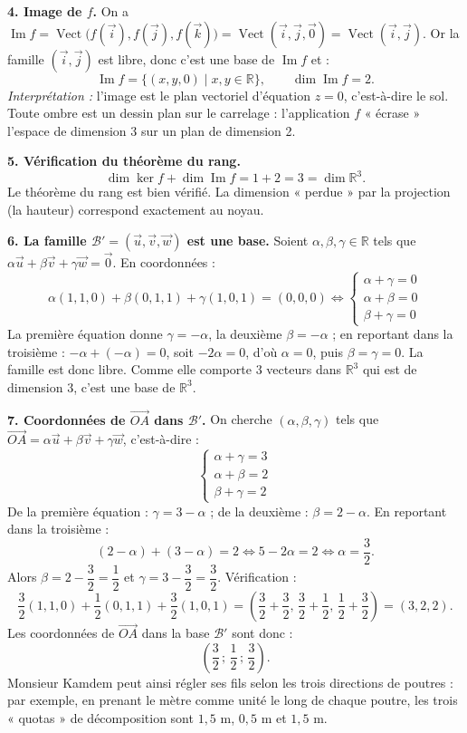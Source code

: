 \documentclass[11pt]{article}
\newcommand{\cle}[1]{{\popxbold\color{popdark}#1}}
\begin{document}
\begin{exoresolu}
\textbf{4. Image de $f$.} On a $\operatorname{Im} f = \operatorname{Vect}\big(f(\vec{i}), f(\vec{j}), f(\vec{k})\big) = \operatorname{Vect}(\vec{i}, \vec{j}, \vec{0}) = \operatorname{Vect}(\vec{i}, \vec{j})$. Or la famille $(\vec{i}, \vec{j})$ est libre, donc c'est une base de $\operatorname{Im} f$ et :
\[
\operatorname{Im} f = \{(x,y,0) \mid x, y \in \mathbb{R}\}, \qquad \dim \operatorname{Im} f = 2.
\]
\emph{Interprétation :} l'image est le plan vectoriel d'équation $z = 0$, c'est-à-dire le sol. Toute ombre est un dessin plan sur le carrelage : l'application $f$ « écrase » l'espace de dimension 3 sur un plan de dimension 2.

\textbf{5. Vérification du théorème du rang.}
\[
\dim \ker f + \dim \operatorname{Im} f = 1 + 2 = 3 = \dim \mathbb{R}^3.
\]
Le théorème du rang est bien vérifié. La dimension « perdue » par la projection (la hauteur) correspond exactement au noyau.

\textbf{6. La famille $\mathcal{B}' = (\vec{u},\vec{v},\vec{w})$ est une base.} Soient $\alpha, \beta, \gamma \in \mathbb{R}$ tels que $\alpha \vec{u} + \beta \vec{v} + \gamma \vec{w} = \vec{0}$. En coordonnées :
\[
\alpha(1,1,0) + \beta(0,1,1) + \gamma(1,0,1) = (0,0,0)
\iff
\begin{cases} \alpha + \gamma = 0 \\ \alpha + \beta = 0 \\ \beta + \gamma = 0 \end{cases}
\]
La première équation donne $\gamma = -\alpha$, la deuxième $\beta = -\alpha$ ; en reportant dans la troisième : $-\alpha + (-\alpha) = 0$, soit $-2\alpha = 0$, d'où $\alpha = 0$, puis $\beta = \gamma = 0$. La famille est donc \cle{libre}. Comme elle comporte $3$ vecteurs dans $\mathbb{R}^3$ qui est de dimension $3$, c'est une \cle{base} de $\mathbb{R}^3$.

\textbf{7. Coordonnées de $\overrightarrow{OA}$ dans $\mathcal{B}'$.} On cherche $(\alpha, \beta, \gamma)$ tels que $\overrightarrow{OA} = \alpha \vec{u} + \beta \vec{v} + \gamma \vec{w}$, c'est-à-dire :
\[
\begin{cases} \alpha + \gamma = 3 \\ \alpha + \beta = 2 \\ \beta + \gamma = 2 \end{cases}
\]
De la première équation : $\gamma = 3 - \alpha$ ; de la deuxième : $\beta = 2 - \alpha$. En reportant dans la troisième :
\[
(2 - \alpha) + (3 - \alpha) = 2 \iff 5 - 2\alpha = 2 \iff \alpha = \dfrac{3}{2}.
\]
Alors $\beta = 2 - \dfrac{3}{2} = \dfrac{1}{2}$ et $\gamma = 3 - \dfrac{3}{2} = \dfrac{3}{2}$. Vérification :
\[
\dfrac{3}{2}(1,1,0) + \dfrac{1}{2}(0,1,1) + \dfrac{3}{2}(1,0,1) = \left(\dfrac{3}{2} + \dfrac{3}{2},\, \dfrac{3}{2} + \dfrac{1}{2},\, \dfrac{1}{2} + \dfrac{3}{2}\right) = (3, 2, 2).
\]
Les coordonnées de $\overrightarrow{OA}$ dans la base $\mathcal{B}'$ sont donc :
\[
\left(\dfrac{3}{2}\,;\, \dfrac{1}{2}\,;\, \dfrac{3}{2}\right).
\]
Monsieur Kamdem peut ainsi régler ses fils selon les trois directions de poutres : par exemple, en prenant le mètre comme unité le long de chaque poutre, les trois « quotas » de décomposition sont $1{,}5$ m, $0{,}5$ m et $1{,}5$ m.


\end{exoresolu}
\end{document}
